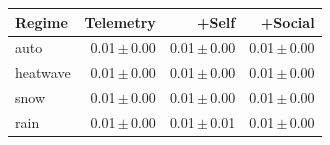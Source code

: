 \begin{tabular}{lrrr}
\toprule
Regime & Telemetry & +Self & +Social \\
\midrule
auto & 0.01\,$\pm$\,0.00 & 0.01\,$\pm$\,0.00 & 0.01\,$\pm$\,0.00 \\
heatwave & 0.01\,$\pm$\,0.00 & 0.01\,$\pm$\,0.00 & 0.01\,$\pm$\,0.00 \\
snow & 0.01\,$\pm$\,0.00 & 0.01\,$\pm$\,0.00 & 0.01\,$\pm$\,0.00 \\
rain & 0.01\,$\pm$\,0.00 & 0.01\,$\pm$\,0.01 & 0.01\,$\pm$\,0.00 \\
\bottomrule
\end{tabular}
